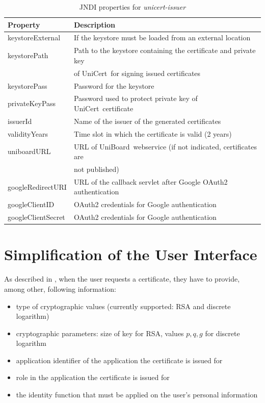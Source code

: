 \documentclass[oneside]{scrreprt}
\newcommand{\uniboard}{\mbox{UniBoard}}
\newcommand{\unicert}{\mbox{UniCert}}
\begin{document}
\begin{table}[ht]

\centering
\begin{tabular}{|l|l|}
  \hline
  Property & Description\\
  \hline
  keystoreExternal & If the keystore must be loaded from an external location\\
  keystorePath & Path to the keystore containing the certificate and private key\\ &  of \unicert\ for signing issued certificates\\
  keystorePass & Password for the keystore \\
  privateKeyPass & Password used to protect private key of \unicert\ certificate \\
  issuerId & Name of the issuer of the generated certificates \\
  validityYears & Time slot in which the certificate is valid (2 years) \\
  uniboardURL & URL of \uniboard\ webservice (if not indicated, certificates are\\ & not published)\\
  googleRedirectURI & URL of the callback servlet after Google OAuth2 authentication \\
  googleClientID & OAuth2 credentials for Google authentication\\
  googleClientSecret & OAuth2 credentials for Google authentication\\
  \hline
\end{tabular}
\caption{JNDI properties for \textit{unicert-issuer}}
\label{t:jndi1}
\end{table}

\section{Simplification of the User Interface}\label{sec:simplification_ui}

As described in , when the user requests a certificate, they have to provide, among other, following information:

\begin{itemize}
\item type of cryptographic values (currently supported: RSA and discrete logarithm)
\item cryptographic parameters: size of key for RSA, values $p,q,g$ for discrete logarithm
\item application identifier of the application the certificate is issued for
\item role in the application the certificate is issued for
\item the identity function that must be applied on the user's personal information
\end{itemize}
\end{document}
